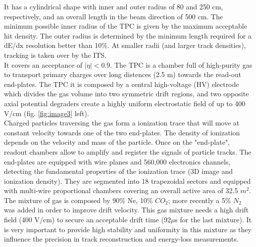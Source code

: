 It has a cylindrical shape with inner and outer radius of 80 and 250 cm, respectively, and an overall length in the beam direction of 500 cm. The minimum possible inner radius of the TPC is given by the maximum acceptable hit density. The outer radius is determined by the minimum length required for a dE/dx resolution better than 10\%. At smaller radii (and larger track densities), tracking is taken over by the ITS.\\It covers an acceptance of $|\eta|<0.9$. The TPC is a  chamber full of high-purity gas to transport primary charges over long distences (2.5 m) towards the read-out end-plates. 
The TPC it is composed by a central high-voltage (HV) electrode which divides the gas volume into two symmetric drift regions, and two opposite axial potential degraders create a highly uniform electrostatic field of up to 400 V/cm (fig. \ref{fig:image3} left).\\
Charged particles traversing the gas form a ionization trace that will move at constant velocity towards one of the two end-plates. The density of ionization depends on the velocity and mass of the particle.
Once on the "end-plate", readout chambers allow to amplify and register the signals of particle tracks.  The end-plates are equipped with wire planes and 560,000 electronics channels, detecting the fundamental properties of the ionization trace (3D image and ionization density). They are segmented into 18 trapezoidal sectors and equipped with multi-wire proportional chambers covering an overall active area of 32.5 $m^2$.
The mixture of gas is composed by 90\% Ne, 10\% $CO_2$; more recently a 5\% $N_2$ was added in order to improve drift velocity. This gas mixture needs a high drift field (400 V/cm) to secure an acceptable drift time (92$\mu$s for the last mixture). It is very important to provide high stability and uniformity in this mixture as they influence the precision in track reconstruction and energy-loss measurements. 


